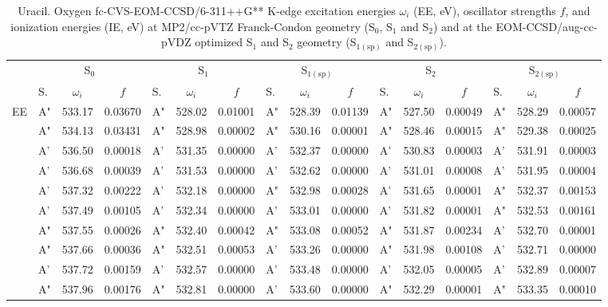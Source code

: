 \documentclass[journal=jctcce,manuscript=article]{achemso}
\begin{document}
\begin{table}
\caption{Uracil.  Oxygen fc-CVS-EOM-CCSD/6-311++G** K-edge excitation energies $\omega_i$ (EE, eV), oscillator strengths $f$, and ionization energies (IE, eV) at MP2/cc-pVTZ Franck-Condon geometry (S$_0$, S$_1$ and S$_2$) and at the EOM-CCSD/aug-cc-pVDZ optimized S$_1$ and S$_2$ geometry (S$_{1(\text{sp})}$ and S$_{2(\text{sp})}$).
\label{Tab:Uracil:CCSD:Oxygen}}
\scriptsize
\begin{tabular}{l|lcc|lcc|lcc|lcc|lcc}
\cline{2-16}
& \multicolumn{3}{c|}{S$_0$}
& \multicolumn{3}{c|}{S$_1$}  
& \multicolumn{3}{c|}{S$_{1(\text{sp})}$}
& \multicolumn{3}{c|}{S$_2$}
& \multicolumn{3}{c}{S$_{2(\text{sp})}$}
\\
\cline{2-16}
& S. & $\omega_i$ & $f$ 
& S. & $\omega_i$ & $f$ 
& S. & $\omega_i$ & $f$ 
& S. & $\omega_i$ & $f$ 
& S. & $\omega_i$ & $f$\\
\hline
  EE 
 &  A"  &  533.17  &  0.03670 & A" & 528.02 & 0.01001 & A" & 528.39 & 0.01139 & A" & 527.50 & 0.00049 & A" & 528.29 & 0.00057 \\ 
 &  A"  &  534.13  &  0.03431 & A" & 528.98 & 0.00002 & A" & 530.16 & 0.00001 & A" & 528.46 & 0.00015 & A" & 529.38 & 0.00025 \\ 
 &  A'  &  536.50  &  0.00018 & A' & 531.35 & 0.00000 & A' & 532.37 & 0.00000 & A' & 530.83 & 0.00003 & A' & 531.91 & 0.00003 \\ 
 &  A'  &  536.68  &  0.00039 & A' & 531.53 & 0.00000 & A' & 532.62 & 0.00000 & A' & 531.01 & 0.00008 & A' & 531.95 & 0.00004 \\ 
 &  A'  &  537.32  &  0.00222 & A' & 532.18 & 0.00000 & A" & 532.98 & 0.00028 & A' & 531.65 & 0.00001 & A" & 532.37 & 0.00153 \\ 
 &  A'  &  537.49  &  0.00105 & A' & 532.34 & 0.00000 & A' & 533.01 & 0.00000 & A' & 531.82 & 0.00001 & A" & 532.53 & 0.00161 \\ 
 &  A"  &  537.55  &  0.00026 & A" & 532.40 & 0.00042 & A" & 533.08 & 0.00052 & A" & 531.87 & 0.00234 & A' & 532.70 & 0.00001 \\ 
 &  A"  &  537.66  &  0.00036 & A" & 532.51 & 0.00053 & A' & 533.26 & 0.00000 & A" & 531.98 & 0.00108 & A' & 532.71 & 0.00000 \\ 
 &  A'  &  537.72  &  0.00159 & A' & 532.57 & 0.00000 & A' & 533.48 & 0.00000 & A' & 532.05 & 0.00005 & A' & 532.89 & 0.00007 \\ 
 &  A"  &  537.96  &  0.00176 & A" & 532.81 & 0.00000 & A' & 533.60 & 0.00000 & A" & 532.29 & 0.00001 & A" & 533.35 & 0.00010 \\ 

\end{tabular}
\end{table}
\end{document}
